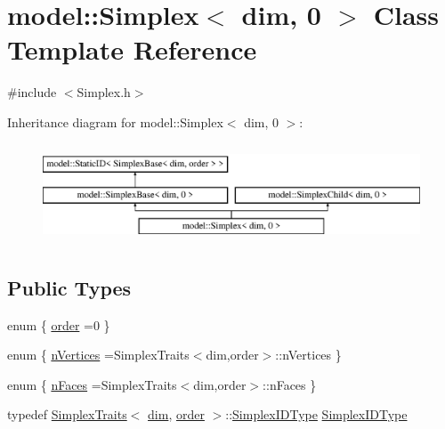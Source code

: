 \hypertarget{classmodel_1_1_simplex_3_01dim_00_010_01_4}{}\section{model\+:\+:Simplex$<$ dim, 0 $>$ Class Template Reference}
\label{classmodel_1_1_simplex_3_01dim_00_010_01_4}


{\ttfamily \#include $<$Simplex.\+h$>$}

Inheritance diagram for model\+:\+:Simplex$<$ dim, 0 $>$\+:\begin{figure}[H]
\begin{center}
\leavevmode
\includegraphics[height=3.000000cm]{classmodel_1_1_simplex_3_01dim_00_010_01_4}
\end{center}
\end{figure}
\subsection*{Public Types}
\begin{DoxyCompactItemize}
\item 
enum \{ \hyperlink{classmodel_1_1_simplex_3_01dim_00_010_01_4_ab6d1cd72337e8ce0a64beaee913246bea90c46bee7ed64bfbbf6278f8dea5b9d1}{order} =0
 \}
\item 
enum \{ \hyperlink{classmodel_1_1_simplex_3_01dim_00_010_01_4_a538c2fdceee0a50c6fb974249e090c52aac03d22ca8d79ffe067a189785345e86}{n\+Vertices} =Simplex\+Traits$<$dim,order$>$\+:\+:n\+Vertices
 \}
\item 
enum \{ \hyperlink{classmodel_1_1_simplex_3_01dim_00_010_01_4_aabf700c13a5ea19e773c5a4c918f9b8ca8a685a1a03cdac5443c9f3b4919d31d9}{n\+Faces} =Simplex\+Traits$<$dim,order$>$\+:\+:n\+Faces
 \}
\item 
typedef \hyperlink{structmodel_1_1_simplex_traits}{Simplex\+Traits}$<$ \hyperlink{plot_nd_a_8m_a382f3ca768b275b8d563604f7fc7df73}{dim}, \hyperlink{classmodel_1_1_simplex_3_01dim_00_010_01_4_ab6d1cd72337e8ce0a64beaee913246bea90c46bee7ed64bfbbf6278f8dea5b9d1}{order} $>$\+::\hyperlink{classmodel_1_1_simplex_3_01dim_00_010_01_4_a83643730c831942341d6e5117a9d59d7}{Simplex\+I\+D\+Type} \hyperlink{classmodel_1_1_simplex_3_01dim_00_010_01_4_a83643730c831942341d6e5117a9d59d7}{Simplex\+I\+D\+Type}
\end{DoxyCompactItemize}
